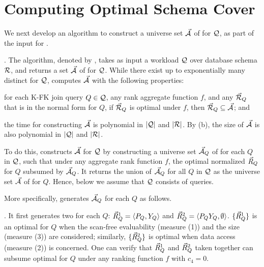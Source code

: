 \vspace{2ex}
\section{Computing Optimal Schema Cover}
\label{sec-cover}

We next develop an algorithm to construct a universe set
$\vec{{\mathcal A}}$ of \bss for $\mathcal Q$, as part of the input for . %

. The algorithm, denoted by \usc, takes as input a workload $\mathcal Q$
over  database schema ${\mathcal R}$, and returns a set $\vec{{\mathcal A}}$ of \bss
for $\mathcal Q$.
While there exist up to exponentially many distinct \bss for
$\mathcal Q$, \usc computes $\vec{{\mathcal A}}$ with the following properties:
\bi
\item[(a)] for each K-FK join \SPC query $Q\in \mathcal Q$, any rank aggregate function $f$,
  and any \bds $\vec{{\mathcal R}}_{Q}$ that is in the normal form for $Q$,
  if $\vec{{\mathcal R}}_{Q}$ is optimal under $f$, then
  $\vec{{\mathcal R}}_{Q}\subseteq \vec{{\mathcal A}}$; and
\item[(b)] the time for constructing $\vec{{\mathcal A}}$ is polynomial in
  $|\mathcal Q|$ and $|{\mathcal R}|$.
\ei
By (b), the size of $\vec{{\mathcal A}}$ is also polynomial in
$|\mathcal Q|$ and $|{\mathcal R}|$.

To do this, \usc constructs $\vec{{\mathcal A}}$ for $\mathcal Q$ by
constructing a universe set $\vec{{\mathcal A}}_{Q}$ of \bss for each 
$Q$ in $\mathcal Q$,
such that under any aggregate rank function $f$, the optimal
normalized \bds $\vec{R}_{Q}$ for $Q$  %
subsumed by $\vec{{\mathcal A}}_{Q}$.
It returns the union of $\vec{{\mathcal A}}_{Q}$ for all $Q$ in $\mathcal Q$ as
the universe set $\vec{{\mathcal A}}$ of \bss for $Q$.
%
Hence, below we assume that $\mathcal Q$ consists of \SPC queries.

More specifically, \usc generates $\vec{{\mathcal A}}_{Q}$ for each $Q$ as follows.

. It first generates two \bss for each  $Q$:
$\vec{R}_{Q}^{1} = \langle P_{Q},\allowbreak Y_{Q}\rangle$ and $\vec{R}_{Q}^{2} =
\langle P_{Q}Y_{Q},\allowbreak \emptyset\rangle$.  $\{\vec{R}_{Q}^{1}\}$ is
an optimal \bds for $Q$ when the scan-free evaluability (measure (1))
and the size (measure (3)) are considered; similarly,
$\{\vec{R}_{Q}^{2}\}$ is optimal when data access (measure (2)) is
concerned.
One can verify that $\vec{R}_{Q}^{1}$ and $\vec{R}_{Q}^{2}$ taken
together can subsume optimal \bdss for $Q$ under any ranking
function $f$ with $c_{4} = 0$.

